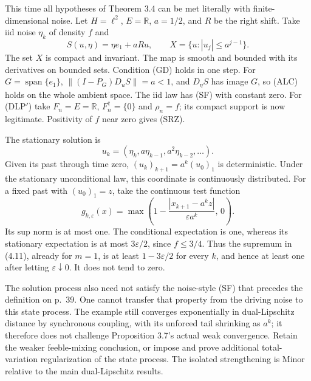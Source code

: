\documentclass[10pt]{article}
\begin{document}
This time all hypotheses of Theorem 3.4 can be met literally with finite-dimensional noise. Let \(H=\ell^2\), \(E=\mathbb R\), \(a=1/2\), and \(R\) be the right shift. Take iid noise \(\eta_k\) of density \(f\) and \[S(u,\eta)=\eta e_1+aRu,\qquad
 X=\{u: |u_j|\leq a^{j-1}\}.\] The set \(X\) is compact and invariant. The map is smooth and bounded with its derivatives on bounded sets. Condition (GD) holds in one step. For \(G=\operatorname{span}\{e_1\}\), \(\|(I-P_G)D_uS\|=a<1\), and \(D_\eta S\) has image \(G\), so (ALC) holds on the whole ambient space. The iid law has (SF) with constant zero. For (DLP\('\)) take \(F_n=E=\mathbb R\), \(F_n^\dagger=\{0\}\) and \(\rho_n=f\); its compact support is now legitimate. Positivity of \(f\) near zero gives (SRZ).\par
The stationary solution is \[u_k=(\eta_k,a\eta_{k-1},a^2\eta_{k-2},\ldots).\] Given its past through time zero, \((u_k)_{k+1}=a^k(u_0)_1\) is deterministic. Under the stationary unconditional law, this coordinate is continuously distributed. For a fixed past with \((u_0)_1=z\), take the continuous test function \[g_{k,\varepsilon}(x)=
 \max\left(1-\frac{|x_{k+1}-a^kz|}{\varepsilon a^k},\,0\right).\] Its sup norm is at most one. The conditional expectation is one, whereas its stationary expectation is at most \(3\varepsilon/2\), since \(f\leq3/4\). Thus the supremum in (4.11), already for \(m=1\), is at least \(1-3\varepsilon/2\) for every \(k\), and hence at least one after letting \(\varepsilon\downarrow0\). It does not tend to zero.\par
The solution process also need not satisfy the noise-style (SF) that precedes the definition on p. 39. One cannot transfer that property from the driving noise to this state process. The example still converges exponentially in dual-Lipschitz distance by synchronous coupling, with its unforced tail shrinking as \(a^k\); it therefore does not challenge Proposition 3.7’s actual weak convergence. Retain the weaker feeble-mixing conclusion, or impose and prove additional total-variation regularization of the state process. The isolated strengthening is Minor relative to the main dual-Lipschitz results.\par
\end{document}
